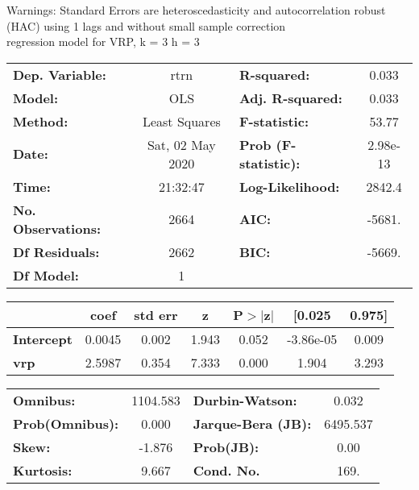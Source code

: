 Warnings: \newline
 [1] Standard Errors are heteroscedasticity and autocorrelation robust (HAC) using 1 lags and without small sample correction\\ 

regression model for VRP, k = 3 h = 3\begin{center}
\begin{tabular}{lclc}
\toprule
\textbf{Dep. Variable:}    &       rtrn       & \textbf{  R-squared:         } &     0.033   \\
\textbf{Model:}            &       OLS        & \textbf{  Adj. R-squared:    } &     0.033   \\
\textbf{Method:}           &  Least Squares   & \textbf{  F-statistic:       } &     53.77   \\
\textbf{Date:}             & Sat, 02 May 2020 & \textbf{  Prob (F-statistic):} &  2.98e-13   \\
\textbf{Time:}             &     21:32:47     & \textbf{  Log-Likelihood:    } &    2842.4   \\
\textbf{No. Observations:} &        2664      & \textbf{  AIC:               } &    -5681.   \\
\textbf{Df Residuals:}     &        2662      & \textbf{  BIC:               } &    -5669.   \\
\textbf{Df Model:}         &           1      & \textbf{                     } &             \\
\bottomrule
\end{tabular}
\begin{tabular}{lcccccc}
                   & \textbf{coef} & \textbf{std err} & \textbf{z} & \textbf{P$> |$z$|$} & \textbf{[0.025} & \textbf{0.975]}  \\
\midrule
\textbf{Intercept} &       0.0045  &        0.002     &     1.943  &         0.052        &    -3.86e-05    &        0.009     \\
\textbf{vrp}       &       2.5987  &        0.354     &     7.333  &         0.000        &        1.904    &        3.293     \\
\bottomrule
\end{tabular}
\begin{tabular}{lclc}
\textbf{Omnibus:}       & 1104.583 & \textbf{  Durbin-Watson:     } &    0.032  \\
\textbf{Prob(Omnibus):} &   0.000  & \textbf{  Jarque-Bera (JB):  } & 6495.537  \\
\textbf{Skew:}          &  -1.876  & \textbf{  Prob(JB):          } &     0.00  \\
\textbf{Kurtosis:}      &   9.667  & \textbf{  Cond. No.          } &     169.  \\
\bottomrule
\end{tabular}
\end{center}

